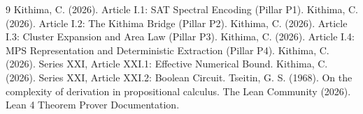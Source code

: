 \documentclass[11pt,a4paper]{article}
\begin{document}

\begin{thebibliography}{9}
  Kithima, C. (2026). Article I.1: SAT Spectral Encoding (Pillar P1).
  Kithima, C. (2026). Article I.2: The Kithima Bridge (Pillar P2).
  Kithima, C. (2026). Article I.3: Cluster Expansion and Area Law (Pillar P3).
  Kithima, C. (2026). Article I.4: MPS Representation and Deterministic Extraction (Pillar P4).
  Kithima, C. (2026). Series XXI, Article XXI.1: Effective Numerical Bound.
  Kithima, C. (2026). Series XXI, Article XXI.2: Boolean Circuit.
  Tseitin, G. S. (1968). On the complexity of derivation in propositional calculus.
  The Lean Community (2026). Lean 4 Theorem Prover Documentation.
\end{thebibliography}
\end{document}
